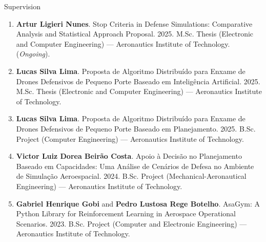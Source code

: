 \documentclass{resume} %
\begin{document}
\begin{rSection}{Supervision}
\footnotesize
\begin{enumerate}
    \item \textbf{Artur Ligieri Nunes}. Stop Criteria in Defense Simulations: Comparative Analysis and Statistical Approach Proposal. 2025. M.Sc. Thesis (Electronic and Computer Engineering) --- Aeronautics Institute of Technology. (\textit{Ongoing}).
    \item \textbf{Lucas Silva Lima}. Proposta de Algoritmo Distribuído para Enxame de Drones Defensivos de Pequeno Porte Baseado em Inteligência Artificial. 2025. M.Sc. Thesis (Electronic and Computer Engineering) --- Aeronautics Institute of Technology.
    \item \textbf{Lucas Silva Lima}. Proposta de Algoritmo Distribuído para Enxame de Drones Defensivos de Pequeno Porte Baseado em Planejamento. 2025. B.Sc. Project (Computer Engineering) --- Aeronautics Institute of Technology.
    \item \textbf{Victor Luiz Dorea Beirão Costa}. Apoio à Decisão no Planejamento Baseado em Capacidades: Uma Análise de Cenários de Defesa no Ambiente de Simulação Aeroespacial. 2024. B.Sc. Project (Mechanical-Aeronautical Engineering) --- Aeronautics Institute of Technology.
    \item \textbf{Gabriel Henrique Gobi} and \textbf{Pedro Lustosa Rege Botelho}. AsaGym: A Python Library for Reinforcement Learning in Aerospace Operational Scenarios. 2023. B.Sc. Project (Computer and Electronic Engineering) --- Aeronautics Institute of Technology.
\end{enumerate}
\end{rSection}




\end{document}
